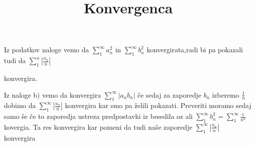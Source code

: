 \documentclass[a4paper]{article}
\begin{document}
\title{Konvergenca}
\date{}
\maketitle
 Iz podatkov naloge vemo da $\displaystyle\sum_{1}^{\infty}a_n^2$ in $\displaystyle\sum_{1}^{\infty}b_n^2$ konvergirata,radi bi pa pokazali tudi da $\displaystyle\sum_{1}^{n}|\frac{a_n}{n}|$

  konvergira.

  Iz naloge b) vemo da konvergira $\displaystyle\sum_{1}^{\infty}|a_nb_n|$ če sedaj za zaporedje $b_n$ izberemo $\frac{1}{n}$ dobimo da $\displaystyle\sum_{1}^{\infty}|\frac{a_n}{n}|$ konvergira kar smo pa želili pokazati.
  Preveriti moramo sedaj samo še če to zaporedja ustreza predpostavki iz besedila oz ali $\displaystyle\sum_{1}^{\infty}b_n^2=\displaystyle\sum_{1}^{\infty}\frac{1}{n^2}$ kovergia. Ta res konvergira kar pomeni da tudi naše zaporedje $\displaystyle\sum_{1}^{\infty}|\frac{a_n}{n}|$ konvergira
\end{document}
